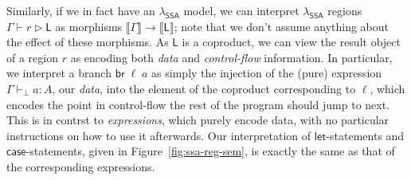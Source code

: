 \documentclass[acmsmall,screen,review]{acmart}
\newcommand{\ms}[1]{\ensuremath{\mathsf{#1}}}
\newcommand{\brb}[2]{\ms{br}\;#1\;#2}
\newcommand{\hasty}[4]{#1 \vdash_{#2} #3: {#4}}
\newcommand{\haslb}[3]{#1 \vdash #2 \rhd #3}
\newcommand{\dnt}[1]{\llbracket{#1}\rrbracket}
\newcommand{\isotopessa}{\(\lambda_{\ms{SSA}}\)}
\begin{document}
Similarly, if we in fact have an \isotopessa{} model, we can interpret \isotopessa{} regions
$\haslb{\Gamma}{r}{\ms{L}}$ as morphisms $\dnt{\Gamma} \to \dnt{\ms{L}}$; note that we don't assume
anything about the effect of these morphisms. As $\ms{L}$ is a coproduct, we can view the result
object of a region $r$ as encoding both \emph{data} and \emph{control-flow} information. In
particular, we interpret a branch $\brb{\ell}{a}$ as simply the injection of the (pure) expression
$\hasty{\Gamma}{\bot}{a}{A}$, our \emph{data}, into the element of the coproduct corresponding to
$\ell$, which encodes the point in control-flow the rest of the program should jump to next. This is
in contrst to \emph{expressions}, which purely encode data, with no particular instructions on how
to use it afterwards. Our interpretation of \ms{let}-statements and \ms{case}-statements, given in
Figure~\ref{fig:ssa-reg-sem}, is exactly the same as that of the corresponding expressions.
\end{document}
